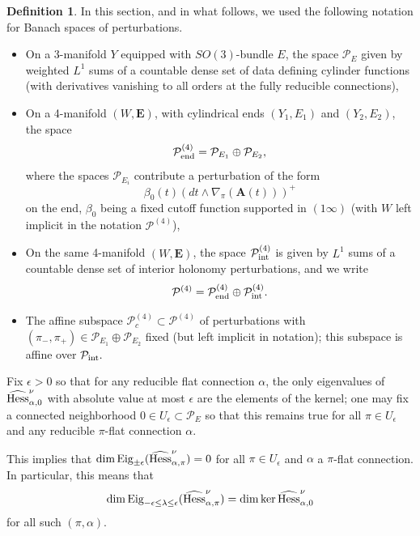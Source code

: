 \documentclass[10pt,a4paper]{amsart}
\theoremstyle{definition}
\newtheorem{definition}[theorem]{Definition}
\theoremstyle{remark}
\numberwithin{figure}{qchap}
\begin{document}
\begin{definition}\label{pertdef}In this section, and in what follows, we used the following notation for Banach spaces of perturbations. \begin{itemize}
\item On a 3-manifold $Y$ equipped with $SO(3)$-bundle $E$, the space $\mathcal P_E$ given by weighted $L^1$ sums of a countable dense set of data defining cylinder functions (with derivatives vanishing to all orders at the fully reducible connections), \\
\item On a 4-manifold $(W,\mathbf{E})$, with cylindrical ends $(Y_1, E_1)$ and $(Y_2, E_2)$, the space $$\mathcal P^{(4)}_{\textup{end}} = \mathcal P_{E_1} \oplus \mathcal P_{E_2},$$ where the spaces $\mathcal P_{E_i}$ contribute a perturbation of the form $$\beta_0(t) \left(dt \wedge \nabla_{\pi}(\mathbf{A}(t))\right)^+$$ on the end, $\beta_0$ being a fixed cutoff function supported in $(1 \infty)$ (with $W$ left implicit in the notation $\mathcal P^{(4)}$), \\
\item On the same 4-manifold $(W, \mathbf{E})$, the space $\mathcal P^{(4)}_{\textup{int}}$ is given by $L^1$ sums of a countable dense set of interior holonomy perturbations, and we write $$\mathcal P^{(4)} = \mathcal P^{(4)}_{\textup{end}} \oplus \mathcal P^{(4)}_{\textup{int}}.$$
\item The affine subspace $\mathcal P^{(4)}_c \subset \mathcal P^{(4)}$ of perturbations with $(\pi_-, \pi_+) \in \mathcal P_{E_1} \oplus \mathcal P_{E_2}$ fixed (but left implicit in notation); this subspace is affine over $\mathcal P_{\textup{int}}.$
\end{itemize}

Fix $\epsilon > 0$ so that for any reducible flat connection $\alpha$, the only eigenvalues of $\widehat{\textup{Hess}}^\nu_{\alpha,0}$ with absolute value at most $\epsilon$ are the elements of the kernel; one may fix a connected neighborhood $0 \in U_\epsilon \subset \mathcal P_E$ so that this remains true for all $\pi \in U_\epsilon$ and any reducible $\pi$-flat connection $\alpha$. 

This implies that $\dim \textup{Eig}_{\pm \epsilon}(\widehat{\textup{Hess}}^\nu_{\alpha,\pi}) = 0$ for all $\pi \in U_\epsilon$ and $\alpha$ a $\pi$-flat connection. In particular, this means that $$\dim \textup{Eig}_{-\epsilon \leq \lambda \leq \epsilon}(\widehat{\textup{Hess}}^\nu_{\alpha,\pi}) = \dim \ker \widehat{\textup{Hess}}^\nu_{\alpha,0}$$ for all such $(\pi, \alpha)$. 


\end{definition}
\end{document}
